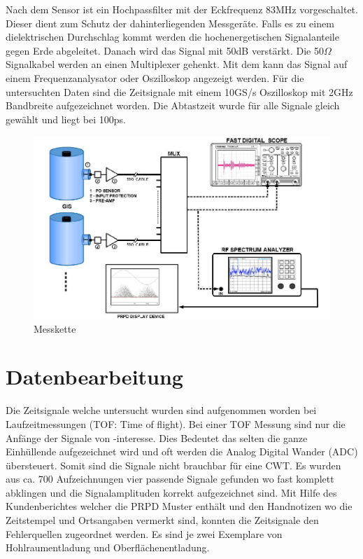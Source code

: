 \begin{refsection}
Nach dem Sensor ist ein Hochpassfilter mit der Eckfrequenz 83MHz vorgeschaltet.
Dieser dient zum Schutz der dahinterliegenden Messgeräte.
Falls es zu einem dielektrischen Durchschlag kommt werden die hochenergetischen Signalanteile gegen Erde abgeleitet.
Danach wird das Signal mit 50dB verstärkt.
Die 50$\Omega$ Signalkabel werden an einen Multiplexer gehenkt. 
Mit dem kann das Signal auf einem Frequenzanalysator oder Oszilloskop angezeigt werden. 
Für die untersuchten Daten sind die Zeitsignale mit einem 10GS/s Oszilloskop mit 2GHz Bandbreite aufgezeichnet worden.
Die Abtastzeit wurde für alle Signale gleich gewählt und liegt bei 100ps. 
\begin{figure}
	\centering
	\includegraphics[width=0.5\linewidth]{papers/gis/Bilder/MessketteAusGIS}
	\caption{Messkette \cite{report:ABBOnSite}}
	\label{fig:messketteausgis}
\end{figure}

 
\section{Datenbearbeitung}

Die Zeitsignale welche untersucht wurden sind aufgenommen worden bei Laufzeitmessungen (TOF: Time of flight). 
Bei einer TOF Messung sind nur die Anfänge der Signale von -interesse.
Dies Bedeutet das selten die ganze Einhüllende aufgezeichnet wird und oft werden die Analog Digital Wander (ADC) übersteuert. 
Somit sind die Signale nicht brauchbar für eine CWT.
Es wurden aus ca. 700 Aufzeichnungen vier passende Signale gefunden wo fast komplett abklingen und die Signalamplituden korrekt aufgezeichnet sind. 
Mit Hilfe des Kundenberichtes welcher die PRPD Muster enthält und den Handnotizen wo die Zeitstempel und Ortsangaben vermerkt sind, konnten die Zeitsignale den Fehlerquellen zugeordnet werden.
Es sind je zwei Exemplare von Hohlraumentladung und Oberflächenentladung.
\begin{figure}
	\centering
	

\end{figure}
\end{refsection}
